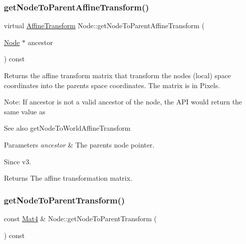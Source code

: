 \subsubsection{\texorpdfstring{get\+Node\+To\+Parent\+Affine\+Transform()}{getNodeToParentAffineTransform()}\hspace{0.1cm}{\footnotesize\ttfamily [2/2]}}
{\footnotesize\ttfamily virtual \hyperlink{structAffineTransform}{Affine\+Transform} Node\+::get\+Node\+To\+Parent\+Affine\+Transform (\begin{DoxyParamCaption}\item[{\hyperlink{classNode}{Node} $\ast$}]{ancestor }\end{DoxyParamCaption}) const\hspace{0.3cm}{\ttfamily [virtual]}}

Returns the affine transform matrix that transform the node\textquotesingle{}s (local) space coordinates into the parent\textquotesingle{}s space coordinates. The matrix is in Pixels.

Note\+: If ancestor is not a valid ancestor of the node, the A\+PI would return the same value as \begin{DoxySeeAlso}{See also}
get\+Node\+To\+World\+Affine\+Transform
\end{DoxySeeAlso}

\begin{DoxyParams}{Parameters}
{\em ancestor} & The parent\textquotesingle{}s node pointer. \\
\hline
\end{DoxyParams}
\begin{DoxySince}{Since}
v3. 
\end{DoxySince}
\begin{DoxyReturn}{Returns}
The affine transformation matrix. 
\end{DoxyReturn}
\mbox{\label{classNode_a7235b4a4d449fb7e01459c5c3b24d1eb}} 
\subsubsection{\texorpdfstring{get\+Node\+To\+Parent\+Transform()}{getNodeToParentTransform()}\hspace{0.1cm}{\footnotesize\ttfamily [1/4]}}
{\footnotesize\ttfamily const \hyperlink{classMat4}{Mat4} \& Node\+::get\+Node\+To\+Parent\+Transform (\begin{DoxyParamCaption}{ }\end{DoxyParamCaption}) const\hspace{0.3cm}{\ttfamily [virtual]}}

